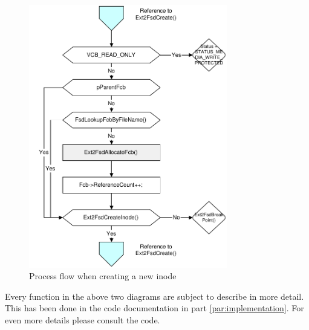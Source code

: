 \begin{figure}[H]
\begin{center}
\includegraphics[height=11.5cm]{./files/inc/pdf/Ext2FsdNewFile}
\end{center}
\caption{\label{fig:ext2FsdNewFile}Process flow when creating a new inode}
\end{figure}

\noindent
Every function in the above two diagrams are subject to describe in more detail. This has been done in the code documentation in part \ref{par:implementation}. For even more details please consult the code.
